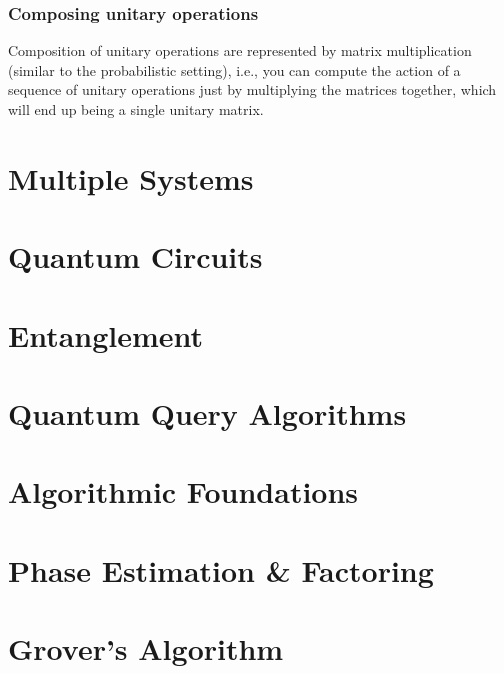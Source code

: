 \documentclass{report}
\begin{document}
\subsection{Composing unitary operations}
Composition of unitary operations are represented by matrix multiplication (similar to the probabilistic setting), i.e., you can compute the action of a sequence of unitary operations just by multiplying the matrices together, which will end up being a single unitary matrix.

\chapter{Multiple Systems}










\chapter{Quantum Circuits}
\chapter{Entanglement}
\chapter{Quantum Query Algorithms}
\chapter{Algorithmic Foundations}
\chapter{Phase Estimation \& Factoring}
\chapter{Grover's Algorithm}
\end{document}
